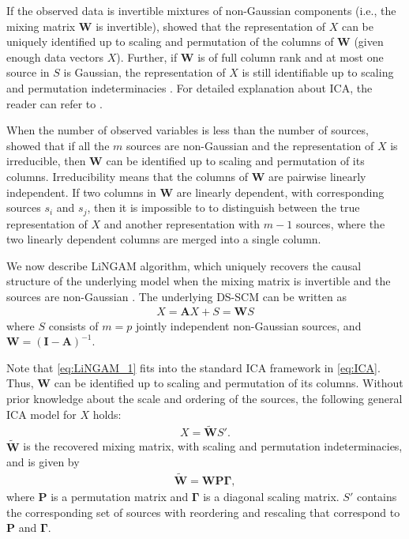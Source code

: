 \documentclass[12pt]{article}
\newcommand{\bA}{\mathbf{A}}
\newcommand{\bW}{\mathbf{W}}
\newcommand{\bI}{\mathbf{I}}
\begin{document}
If the observed data is invertible mixtures of non-Gaussian components (i.e., the mixing matrix $\bW$ is invertible), \citet{comon1994independent} showed that the representation of $X$ can be uniquely identified up to scaling and permutation of the columns of $\bW$ (given enough data vectors $X$). Further, if $\bW$ is of full column rank and at most one source in $S$ is Gaussian, the representation of $X$ is still identifiable up to scaling and permutation indeterminacies \citep{eriksson2004identifiability}. For detailed explanation about ICA, the reader can refer to \citep{hyvarinen2000independent,comon2010handbook}.

When the number of observed variables is less than the number of sources, \citet{eriksson2004identifiability} showed that if all the $m$ sources are non-Gaussian and the representation of $X$ is irreducible, then $\bW$ can be identified up to scaling and permutation of its columns. Irreducibility means that the columns of $\bW$ are pairwise linearly independent. If two columns in $\bW$ are linearly dependent, with corresponding sources $s_i$ and $s_j$, then it is impossible to to distinguish between the true representation of $X$ and another representation with $m-1$ sources, where the two linearly dependent columns are merged into a single column.

We now describe LiNGAM algorithm, which uniquely recovers the causal structure of the underlying model when the mixing matrix is invertible and the sources are non-Gaussian \citep{shimizu2006linear}. The underlying DS-SCM can be written as
\begin{align}
\label{eq:LiNGAM_1}
    X= \bA X+ S= \bW S
\end{align}
where $S$ consists of $m=p$ jointly independent non-Gaussian sources, and $\bW=(\bI-\bA)^{-1}$. 

Note that \eqref{eq:LiNGAM_1} fits into the standard ICA framework in \eqref{eq:ICA}. Thus, $\bW$ can be identified up to scaling and permutation of its columns. Without prior knowledge about the scale and ordering of the sources, the following general ICA model for $X$ holds:
\begin{align}
\label{eq:BSS_output}
X=\tilde{\bW} S'.
\end{align}
$\tilde{\mathbf{W}}$ is the recovered mixing matrix, with scaling and permutation indeterminacies, and is given by
\begin{align}
\label{eq:W_hat}
\tilde{\bW}=\bW \mathbf{P} \mathbf{\Gamma},
\end{align}
where $\mathbf{P}$ is a permutation matrix and $\mathbf{\Gamma}$ is a diagonal scaling matrix. $S'$ contains the corresponding set of sources with reordering and rescaling that correspond to $\mathbf{P}$ and $\mathbf{\Gamma}$. 
\end{document}
